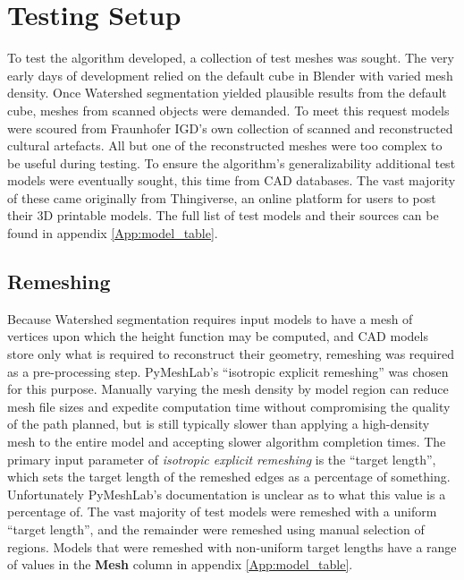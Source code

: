 \section{Testing Setup}

To test the algorithm developed, a collection of test meshes was sought.
The very early days of development relied on the default cube in Blender with varied mesh density.
Once Watershed segmentation yielded plausible results from the default cube, meshes from scanned objects were demanded.
To meet this request models were scoured from Fraunhofer IGD's own collection of scanned and reconstructed cultural artefacts.
All but one of the reconstructed meshes were too complex to be useful during testing.
To ensure the algorithm's generalizability additional test models were eventually sought, this time from CAD databases.
The vast majority of these came originally from Thingiverse, an online platform for users to post their 3D printable models\cite{Thingiverse}.
The full list of test models and their sources can be found in appendix \ref{App:model_table}.

\subsection{Remeshing}
Because Watershed segmentation requires input models to have a mesh of vertices upon which the height function may be computed, and CAD models store only what is required to reconstruct their geometry, remeshing was required as a pre-processing step.
PyMeshLab's ``isotropic explicit remeshing''\cite{PyMeshLab} was chosen for this purpose.
Manually varying the mesh density by model region can reduce mesh file sizes and expedite computation time without compromising the quality of the path planned, but is still typically slower than applying a high-density mesh to the entire model and accepting slower algorithm completion times.
The primary input parameter of \textit{isotropic explicit remeshing} is the ``target length'', which sets the target length of the remeshed edges as a percentage of something.
Unfortunately PyMeshLab's documentation is unclear as to what this value is a percentage of.
The vast majority of test models were remeshed with a uniform ``target length'', and the remainder were remeshed using manual selection of regions.
Models that were remeshed with non-uniform target lengths have a range of values in the \textbf{Mesh} column in appendix \ref{App:model_table}.

